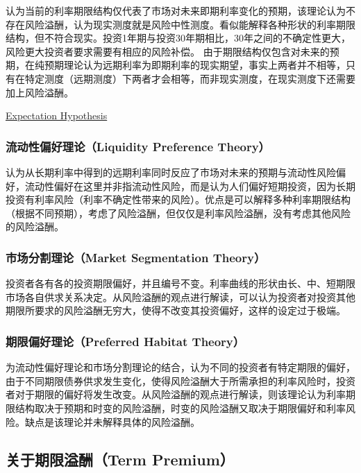\documentclass[11pt]{article}
\begin{document}
认为当前的利率期限结构仅代表了市场对未来即期利率变化的预期，该理论认为不存在风险溢酬，认为现实测度就是风险中性测度。看似能解释各种形状的利率期限结构，但不符合现实。投资1年期与投资30年期相比，30年之间的不确定性更大，风险更大投资者要求需要有相应的风险补偿。
由于期限结构仅包含对未来的预期，在纯预期理论认为远期利率为即期利率的现实期望，事实上两者并不相等，只有在特定测度（远期测度）下两者才会相等，而非现实测度，在现实测度下还需要加上风险溢酬。

\href{https://en.wikipedia.org/wiki/Expectations_hypothesis}{Expectation Hypothesis}

\subsubsection{流动性偏好理论（Liquidity Preference Theory）}

认为从长期利率中得到的远期利率同时反应了市场对未来的预期与流动性风险偏好，流动性偏好在这里并非指流动性风险，而是认为人们偏好短期投资，因为长期投资有利率风险（利率不确定性带来的风险）。优点是可以解释多种利率期限结构（根据不同预期），考虑了风险溢酬，但仅仅是利率风险溢酬，没有考虑其他风险的风险溢酬。

\subsubsection{市场分割理论（Market Segmentation Theory）}

投资者各有各的投资期限偏好，并且编号不变。利率曲线的形状由长、中、短期限市场各自供求关系决定。从风险溢酬的观点进行解读，可以认为投资者对投资其他期限所要求的风险溢酬无穷大，使得不改变其投资偏好，这样的设定过于极端。

\subsubsection{期限偏好理论（Preferred Habitat Theory）}

为流动性偏好理论和市场分割理论的结合，认为不同的投资者有特定期限的偏好，由于不同期限债券供求发生变化，使得风险溢酬大于所需承担的利率风险时，投资者对于期限的偏好将发生改变。从风险溢酬的观点进行解读，则该理论认为利率期限结构取决于预期和时变的风险溢酬，时变的风险溢酬又取决于期限偏好和利率风险。缺点是该理论并未解释具体的风险溢酬。

\subsection{关于期限溢酬（Term Premium）}
\end{document}
